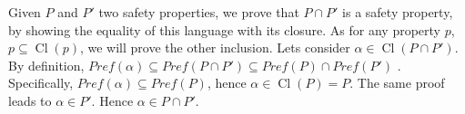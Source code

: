 \documentclass[11pt,a4paper]{article}
\newcommand\twoap{2^{AP}}
\DeclareMathOperator{\Cl}{Cl}
\begin{document}
\begin{Answer}
\Question%
Given $P$ and $P'$ two safety properties, we prove that $P\cap P'$ is a safety property, by showing the equality of this language with its closure.
As for any property $p$, $p \subseteq \Cl(p)$, we will prove the other inclusion. Lets consider $\alpha \in \Cl(P\cap P')$. By definition, $Pref(\alpha) \subseteq Pref(P\cap P') \subseteq Pref(P) \cap Pref(P')$ \footnotemark[2].
Specifically, $Pref(\alpha) \subseteq Pref(P)$, hence $\alpha \in \Cl(P) = P$. The same proof leads to $\alpha \in P'$. Hence $\alpha \in P\cap P'$.


\end{Answer}
\end{document}
